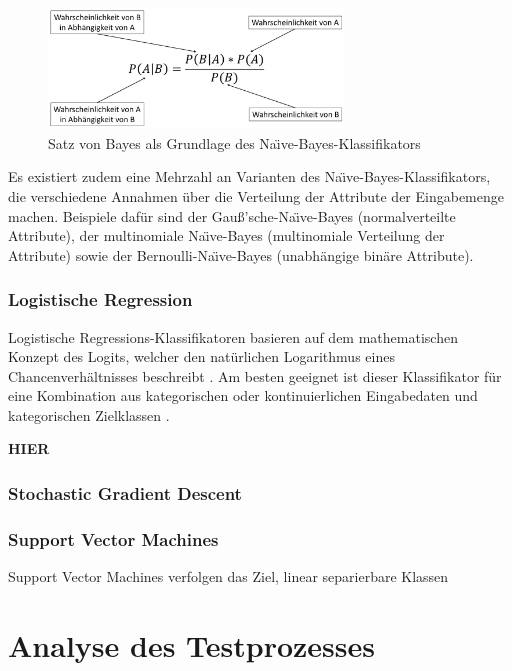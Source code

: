\begin{figure}[]
    \centering
    \includegraphics[width=0.7\textwidth]{images/NB}
    \caption{Satz von Bayes als Grundlage des Na\"{\i}ve-Bayes-Klassifikators\label{fig:nb}}
\end{figure}

Es existiert zudem eine Mehrzahl an Varianten des Na\"{\i}ve-Bayes-Klassifikators, die verschiedene Annahmen über die Verteilung der Attribute der Eingabemenge machen. Beispiele dafür sind der Gauß'sche-Na\"{\i}ve-Bayes (normalverteilte Attribute), der multinomiale Na\"{\i}ve-Bayes (multinomiale Verteilung der Attribute) sowie der Bernoulli-Na\"{\i}ve-Bayes (unabhängige binäre Attribute).

\subsubsection*{Logistische Regression}
Logistische Regressions-Klassifikatoren basieren auf dem mathematischen Konzept des Logits, welcher den natürlichen Logarithmus eines Chancenverhältnisses beschreibt \cite{Peng2002}. Am besten geeignet ist dieser Klassifikator für eine Kombination aus kategorischen oder kontinuierlichen Eingabedaten und kategorischen Zielklassen \cite{Peng2002}.

\textbf{HIER}

\subsubsection*{Stochastic Gradient Descent}
\cite{Bottou2010}

\subsubsection*{Support Vector Machines}
Support Vector Machines verfolgen das Ziel, linear separierbare Klassen 
\cite{Tzotsos2006}

\section{Analyse des Testprozesses}

